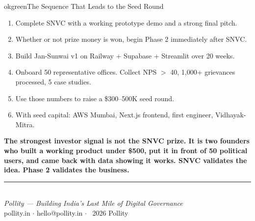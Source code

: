 \documentclass[12pt, a4paper]{article}
\begin{document}
\begin{callout}{okgreen}{The Sequence That Leads to the Seed Round}
\begin{enumerate}[leftmargin=1.5em, itemsep=0.3em]
    \item Complete SNVC with a working prototype demo and a strong final pitch.
    \item Whether or not prize money is won, begin Phase 2 immediately after SNVC.
    \item Build Jan-Sunwai v1 on Railway + Supabase + Streamlit over 20 weeks.
    \item Onboard 50 representative offices. Collect NPS $>$ 40, 1,000+ grievances
          processed, 5 case studies.
    \item Use those numbers to raise a \$300--500K seed round.
    \item With seed capital: AWS Mumbai, Next.js frontend, first engineer, Vidhayak-Mitra.
\end{enumerate}

\vspace{0.4em}
\textbf{The strongest investor signal is not the SNVC prize.
It is two founders who built a working product under \$500, put it
in front of 50 political users, and came back with data showing it works.
SNVC validates the idea. Phase 2 validates the business.}
\end{callout}

\vfill
\begin{center}
    {\color{midgray}\rule{0.5\linewidth}{0.5pt}}\\[0.3cm]
    {\small\itshape Pollity --- Building India's Last Mile of Digital Governance}\\
    {\small pollity.in \quad $\cdot$ \quad hello@pollity.in \quad $\cdot$ \quad \textcopyright\ 2026 Pollity}
\end{center}
\end{document}
